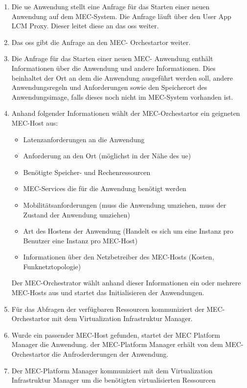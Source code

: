 \documentclass[runningheads]{llncs}
\numberwithin{figure}{section}
\begin{document}
\begin{enumerate}
  \item Die \acrshort{ue} Anwendung stellt eine Anfrage für das Starten einer neuen Anwendung auf dem MEC-System. Die Anfrage läuft über den 
  User App LCM Proxy. Dieser leitet diese an das \acrlong{oss} weiter.
  \item Das \acrshort{oss} gibt die Anfrage an den MEC- Orchestartor weiter.
  \item Die Anfrage für das Starten einer neuen MEC- Anwendung enthält Informationen über 
  die Anwendung und andere Informationen. Dies beinhaltet der Ort an dem die Anwendung ausgeführt werden soll, 
  andere Anwendungsregeln und Anforderungen sowie den Speicherort des Anwendungsimage, 
  falls dieses noch nicht im MEC-System vorhanden ist. 
  \item Anhand folgender Informationen wählt der MEC-Orchestartor ein geigneten MEC-Host aus:
  \begin{itemize}
    \item Latenzanforderungen an die Anwendung
    \item Anforderung an den Ort (möglichst in der Nähe des \acrshort{ue})
    \item Benötigte Speicher- und Rechenressourcen
    \item MEC-Services die für die Anwendung benötigt werden
    \item Mobilitätsanforderungen (muss die Anwendung umziehen, muss der Zustand der Anwendung umziehen)
    \item Art des Hostens der Anwendung (Handelt es sich um eine Instanz pro Benutzer eine Instanz pro MEC-Host)
    \item Informationen über den Netzbetreiber des MEC-Hosts (Kosten, Funknetztopologie)
  \end{itemize}
  Der MEC-Orchestrator wählt anhand dieser Informationen ein oder mehrere MEC-Hosts aus und startet das Initialisieren der Anwendungen.
  \item Für das Abfragen der verfügbaren Ressourcen kommuniziert der MEC-Orchestartor mit dem Virtualization Infrastruktur Manager.
  \item Wurde ein passender MEC-Host gefunden, startet der MEC Platform Manager die Anwendung. der MEC-Platform Manager erhält von dem 
  MEC-Orchestartor die Anfroderderungen der Anwendung.
  \item Der MEC-Platform Manager kommuniziert mit dem Virtualization Infrastruktur Manager um die benötigten virtualisierten Ressourcen 

\end{enumerate}
\end{document}
